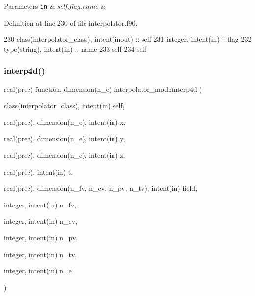 \begin{DoxyParams}[1]{Parameters}
\mbox{\tt in}  & {\em self,flag,name} & \\
\hline
\end{DoxyParams}


Definition at line 230 of file interpolator.\+f90.


\begin{DoxyCode}
230     \textcolor{keywordtype}{class}(interpolator\_class), \textcolor{keywordtype}{intent(inout)} :: self
231     \textcolor{keywordtype}{integer}, \textcolor{keywordtype}{intent(in)} :: flag
232     \textcolor{keywordtype}{type}(string), \textcolor{keywordtype}{intent(in)} :: name
233     self%
234     self%
\end{DoxyCode}
\mbox{\label{namespaceinterpolator__mod_ac54a92d43721099e8e5bc5a888d7ee73}} 
\subsubsection{\texorpdfstring{interp4d()}{interp4d()}}
{\footnotesize\ttfamily real(prec) function, dimension(n\+\_\+e) interpolator\+\_\+mod\+::interp4d (\begin{DoxyParamCaption}\item[{class(\mbox{\hyperlink{structinterpolator__mod_1_1interpolator__class}{interpolator\+\_\+class}}), intent(in)}]{self,  }\item[{real(prec), dimension(n\+\_\+e), intent(in)}]{x,  }\item[{real(prec), dimension(n\+\_\+e), intent(in)}]{y,  }\item[{real(prec), dimension(n\+\_\+e), intent(in)}]{z,  }\item[{real(prec), intent(in)}]{t,  }\item[{real(prec), dimension(n\+\_\+fv, n\+\_\+cv, n\+\_\+pv, n\+\_\+tv), intent(in)}]{field,  }\item[{integer, intent(in)}]{n\+\_\+fv,  }\item[{integer, intent(in)}]{n\+\_\+cv,  }\item[{integer, intent(in)}]{n\+\_\+pv,  }\item[{integer, intent(in)}]{n\+\_\+tv,  }\item[{integer, intent(in)}]{n\+\_\+e }\end{DoxyParamCaption})\hspace{0.3cm}{\ttfamily [private]}}



